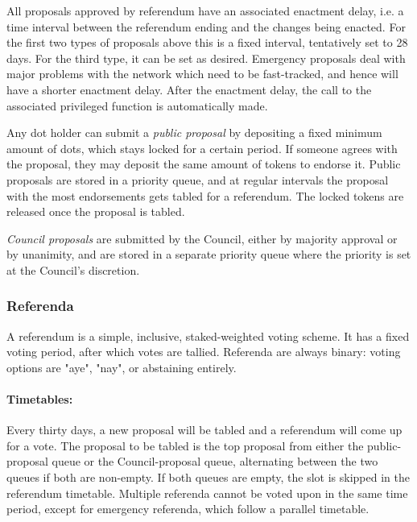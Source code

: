 All proposals approved by referendum have an associated enactment delay, i.e. a time interval between the referendum ending and the changes being enacted. For the first two types of proposals above this is a fixed interval, tentatively set to 28 days. For the third type, it can be set as desired. Emergency proposals deal with major problems with the network which need to be fast-tracked, and hence will have a shorter enactment delay. After the enactment delay, the call to the associated privileged function is automatically made.

Any dot holder can submit a \emph{public proposal} by depositing a fixed minimum amount of dots, which stays locked for a certain period. If someone agrees with the proposal, they may deposit the same amount of tokens to endorse it. Public proposals are stored in a priority queue, and at regular intervals the proposal with the most endorsements gets tabled for a referendum. The locked tokens are released once the proposal is tabled.

\emph{Council proposals} are submitted by the Council, either by majority approval or by unanimity, and are stored in a separate priority queue where the priority is set at the Council's discretion. 


\subsubsection{Referenda}

A referendum is a simple, inclusive, staked-weighted voting scheme. It has a fixed voting period, after which votes are tallied. Referenda are always binary: voting options are "aye", "nay", or abstaining entirely.

\paragraph{Timetables:} Every thirty days, a new proposal will be tabled and a referendum will come up for a vote. The proposal to be tabled is the top proposal from either the public-proposal queue or the Council-proposal queue, alternating between the two queues if both are non-empty. If both queues are empty, the slot is skipped in the referendum timetable. Multiple referenda cannot be voted upon in the same time period, except for emergency referenda, which follow a parallel timetable.


